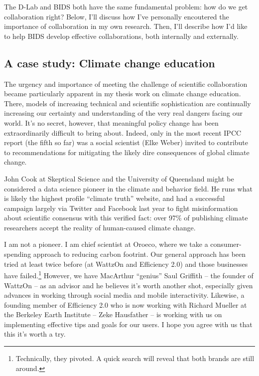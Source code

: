 \documentclass[12pt]{article}
\begin{document}
The D-Lab and BIDS both have the same fundamental problem: how do we get
collaboration right? Below, I'll discuss how I've personally encoutered the
importance of collaboration in my own research. Then, I'll describe how I'd like
to help BIDS develop effective collaborations, both internally and externally.

\subsection*{A case study: Climate change education}

The urgency and importance of meeting the challenge of scientific collaboration
became particularly apparent in my thesis work on climate change education.
There, models of increasing technical and scientific sophistication are
continually increasing our certainty and understanding of the very real dangers
facing our world. It's no secret, however, that meaningful policy change has
been extraordinarily difficult to bring about. Indeed, only in the most recent
IPCC report (the fifth so far) was a social scientist (Elke Weber) invited to
contribute to recommendations for mitigating the likely dire consequences of
global climate change.

John Cook at Skeptical Science and the University of Queensland might be
considered a data science pioneer in the climate and behavior field. He runs
what is likely the highest profile “climate truth” website, and had a successful
campaign largely via Twitter and Facebook last year to fight misinformation
about scientific consensus with this verified fact: over 97\% of publishing
climate researchers accept the reality of human-caused climate change. 

I am not a pioneer. I am chief scientist at Oroeco, where we take a
consumer-spending approach to reducing carbon footrint.  Our general approach
has been tried at least twice before (at WattzOn and Efficiency 2.0) and those
businesses have failed.\footnote{Technically, they pivoted. A quick search will
    reveal that both brands are still around.} However, we have MacArthur
“genius” Saul Griffith -- the founder of WattzOn -- as an advisor and he
believes it's worth another shot, especially given advances in working through
social media and mobile interactivity. Likewise, a founding member of Efficiency
2.0 who is now working with Richard Mueller at the Berkeley Earth Institute --
Zeke Hausfather -- is working with us on implementing effective tips and goals
for our users. I hope you agree with us that this it's worth a try.
\end{document}
